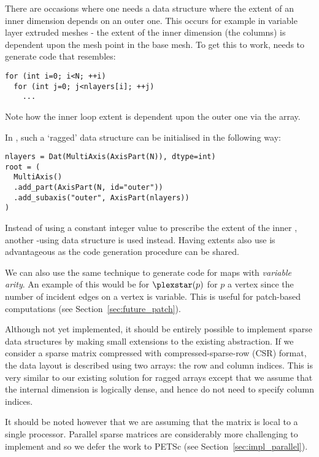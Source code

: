 There are occasions where one needs a data structure where the extent of an inner dimension depends on an outer one.
This occurs for example in variable layer extruded meshes - the extent of the inner dimension (the columns) is dependent upon the mesh point in the base mesh.
To get this to work,  needs to generate code that resembles:

\begin{verbatim}
for (int i=0; i<N; ++i)
  for (int j=0; j<nlayers[i]; ++j)
    ...
\end{verbatim}

Note how the inner loop extent is dependent upon the outer one via the  array.

In , such a `ragged' data structure can be initialised in the following way:

\begin{verbatim}
nlayers = Dat(MultiAxis(AxisPart(N)), dtype=int)
root = (
  MultiAxis()
  .add_part(AxisPart(N, id="outer"))
  .add_subaxis("outer", AxisPart(nlayers))
)
\end{verbatim}

Instead of using a constant integer value to prescribe the extent of the inner , another -using data structure is used instead.
Having extents also use  is advantageous as the code generation procedure can be shared.

We can also use the same technique to generate code for maps with \textit{variable arity}.
An example of this would be for $\plexstar(p)$ for $p$ a vertex since the number of incident edges on a vertex is variable.
This is useful for patch-based computations (see Section~\ref{sec:future_patch}).

Although not yet implemented, it should be entirely possible to implement sparse data structures by making small extensions to the existing abstraction.
If we consider a sparse matrix compressed with compressed-sparse-row (CSR) format, the data layout is described using two arrays: the row and column indices.
This is very similar to our existing solution for ragged arrays except that we assume that the internal dimension is logically dense, and hence do not need to specify column indices.

It should be noted however that we are assuming that the matrix is local to a single processor.
Parallel sparse matrices are considerably more challenging to implement and so we defer the work to PETSc (see Section~\ref{sec:impl_parallel}).

